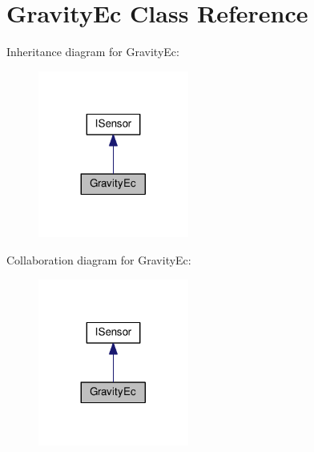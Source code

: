 \hypertarget{class_gravity_ec}{}\section{Gravity\+Ec Class Reference}
\label{class_gravity_ec}


Inheritance diagram for Gravity\+Ec\+:\nopagebreak
\begin{figure}[H]
\begin{center}
\leavevmode
\includegraphics[width=140pt]{class_gravity_ec__inherit__graph}
\end{center}
\end{figure}


Collaboration diagram for Gravity\+Ec\+:\nopagebreak
\begin{figure}[H]
\begin{center}
\leavevmode
\includegraphics[width=140pt]{class_gravity_ec__coll__graph}
\end{center}
\end{figure}
